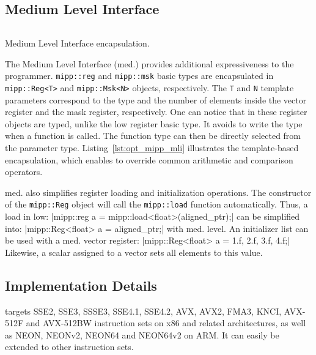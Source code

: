 \subsection{Medium Level Interface}

\begin{listing}[htp]
  \inputminted[frame=lines,linenos]{C++}{main/chapter3/src/mipp/mli.cpp}
  \caption{Medium Level Interface encapsulation.}
  \label{lst:opt_mipp_mli}
\end{listing}

The \MIPP Medium Level Interface (\MIPP med.) provides additional expressiveness
to the programmer. \verb|mipp::reg| and \verb|mipp::msk| basic types are
encapsulated in \verb|mipp::Reg<T>| and \verb|mipp::Msk<N>| objects,
respectively. The \verb|T| and \verb|N| template parameters correspond to the
type and the number of elements inside the vector register and the mask
register, respectively. One can notice that in these register objects are typed,
unlike the \MIPP low register basic type. It avoids to write the type when a
\MIPP function is called. The function type can then be directly selected from
the parameter type. Listing~\ref{lst:opt_mipp_mli} illustrates the
template-based encapsulation, which enables \MIPP to override common arithmetic
and comparison operators.

\MIPP med. also simplifies register loading and initialization operations. The
constructor of the \verb|mipp::Reg| object will call the \verb|mipp::load|
function automatically. Thus, a load in \MIPP low:
|mipp::reg a = mipp::load<float>(aligned_ptr);|
{\noindent
can be simplified into:
}
|mipp::Reg<float> a = aligned_ptr;|
{\noindent
with \MIPP med. level. An initializer list
can be used with a \MIPP med. vector register:
}
|mipp::Reg<float> a = {1.f, 2.f, 3.f, 4.f};|
{\noindent
Likewise, a scalar assigned to a vector sets all elements to
this value.
}

\subsection{Implementation Details}
\label{sec:opt_mipp_implem}

\MIPP targets SSE2, SSE3, SSSE3, SSE4.1, SSE4.2, AVX, AVX2, FMA3, KNCI, AVX-512F
and AVX-512BW instruction sets on x86 and related architectures, as well as
NEON, NEONv2, NEON64 and NEON64v2 on ARM\R. It can easily be extended to other
instruction sets.

